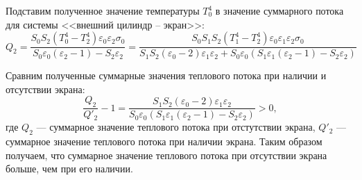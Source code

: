 \documentclass[12pt, a4paper]{article}
\begin{document}
Подставим полученное значение температуры $T^4_0$ в значение суммарного потока для системы <<внешний цилиндр – экран>>:
\[
Q_2 = \frac{S_0 S_2 (T_0^4 - T_2^4) \varepsilon_0 \varepsilon_2 \sigma_0}{S_0 \varepsilon_0 (\varepsilon_2- 1 ) - S_2 \varepsilon_2} = \frac{S_0 S_1 S_2 (T_1^4 - T_2^4) \varepsilon_0 \varepsilon_1 \varepsilon_2 \sigma_0}{S_1 S_2 (\varepsilon_0 - 2) \varepsilon_1 \varepsilon_2 + S_0 \varepsilon_0 (S_1 \varepsilon_1 (\varepsilon_2 - 1) - S_2 \varepsilon_2)}
\]

Сравним полученные суммарные значения теплового потока при наличии и отсутствии экрана:
\[
\frac{Q_2}{Q'_2} - 1 = \frac{S_1 S_2 (\varepsilon_0 - 2) \varepsilon_1 \varepsilon_2}{S_0 \varepsilon_0 (S_1 \varepsilon_1 (\varepsilon_2 -1) - S_2 \varepsilon_2)} > 0,
\]
где $Q_2$ --- суммарное значение теплового потока при отстутствии экрана, $Q'_2$ --- суммарное значение теплового потока при наличии экрана. Таким образом получаем,
что суммарное значение теплового потока при отсутствии экрана больше, чем при
его наличии.
\end{document}
